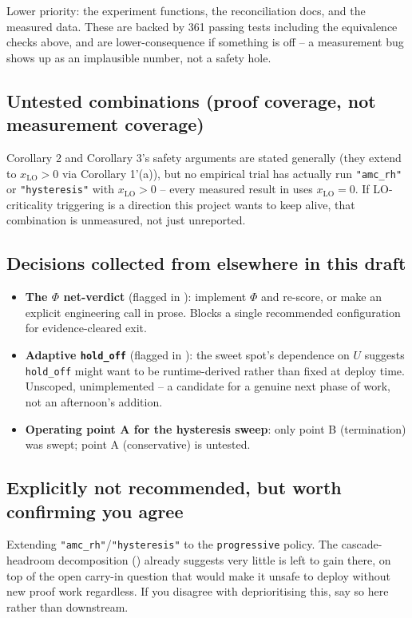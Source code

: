 Lower priority: the experiment functions, the reconciliation docs, and the measured data. These
are backed by 361 passing tests including the equivalence checks above, and are lower-consequence
if something is off -- a measurement bug shows up as an implausible number, not a safety hole.

\subsection{Untested combinations (proof coverage, not measurement coverage)}

Corollary 2 and Corollary 3's safety arguments are stated generally (they extend to
$x_{\mathrm{LO}} > 0$ via Corollary 1'(a)), but no empirical trial has actually run
\texttt{"amc\_rh"} or \texttt{"hysteresis"} with $x_{\mathrm{LO}} > 0$ -- every measured result in
 uses $x_{\mathrm{LO}} = 0$. If LO-criticality triggering is a direction
this project wants to keep alive, that combination is unmeasured, not just unreported.

\subsection{Decisions collected from elsewhere in this draft}

\begin{itemize}
\item \textbf{The $\Phi$ net-verdict} (flagged in ): implement $\Phi$ and
  re-score, or make an explicit engineering call in prose. Blocks a single recommended
  configuration for evidence-cleared exit.
\item \textbf{Adaptive \texttt{hold\_off}} (flagged in ): the sweet spot's
  dependence on $U$ suggests \texttt{hold\_off} might want to be runtime-derived rather than
  fixed at deploy time. Unscoped, unimplemented -- a candidate for a genuine next phase of work,
  not an afternoon's addition.
\item \textbf{Operating point A for the hysteresis sweep}: only point B (termination) was swept;
  point A (conservative) is untested.
\end{itemize}

\subsection{Explicitly not recommended, but worth confirming you agree}

Extending \texttt{"amc\_rh"}/\texttt{"hysteresis"} to the \texttt{progressive} policy. The
cascade-headroom decomposition () already suggests very little is left to
gain there, on top of the open carry-in question that would make it unsafe to deploy without new
proof work regardless. If you disagree with deprioritising this, say so here rather than
downstream.

